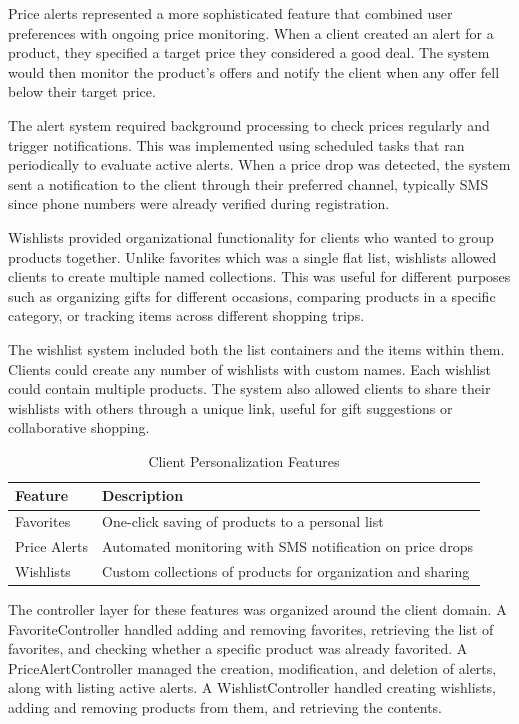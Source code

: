 Price alerts represented a more sophisticated feature that
combined user preferences with ongoing price monitoring. When a
client created an alert for a product, they specified a target
price they considered a good deal. The system would then monitor
the product's offers and notify the client when any offer fell
below their target price.

The alert system required background processing to check prices
regularly and trigger notifications. This was implemented using
scheduled tasks that ran periodically to evaluate active alerts.
When a price drop was detected, the system sent a notification
to the client through their preferred channel, typically SMS
since phone numbers were already verified during registration.

Wishlists provided organizational functionality for clients who
wanted to group products together. Unlike favorites which was a
single flat list, wishlists allowed clients to create multiple
named collections. This was useful for different purposes such
as organizing gifts for different occasions, comparing products
in a specific category, or tracking items across different
shopping trips.

The wishlist system included both the list containers and the
items within them. Clients could create any number of wishlists
with custom names. Each wishlist could contain multiple products.
The system also allowed clients to share their wishlists with
others through a unique link, useful for gift suggestions or
collaborative shopping.

\begin{table}[H]
\begin{center}
\begin{tabular}{|m{3cm}|m{6cm}|}
\hline
\textbf{Feature} & \textbf{Description} \\ \hline
Favorites & One-click saving of products to a personal list \\ \hline
Price Alerts & Automated monitoring with SMS notification on price drops \\ \hline
Wishlists & Custom collections of products for organization and sharing \\ \hline
\end{tabular}
\caption{Client Personalization Features}
\label{tab:client_features}
\end{center}
\end{table}

The controller layer for these features was organized around the
client domain. A FavoriteController handled adding and removing
favorites, retrieving the list of favorites, and checking whether
a specific product was already favorited. A PriceAlertController
managed the creation, modification, and deletion of alerts,
along with listing active alerts. A WishlistController handled
creating wishlists, adding and removing products from them, and
retrieving the contents.

